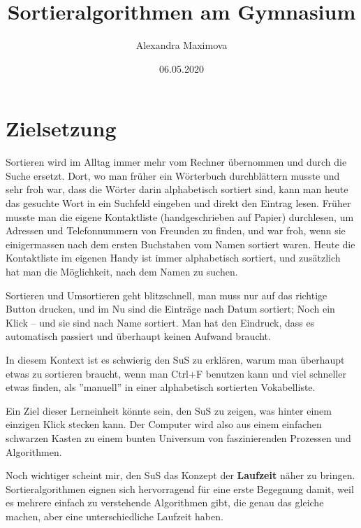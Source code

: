 \documentclass[
	12pt, %
	german, %
]{fphw}
\title{Sortieralgorithmen am Gymnasium} %
\author{Alexandra Maximova} %
\date{06.05.2020} %
\institute{ETH Zurich \\ Lehrdiplom Informatik} %
\begin{document}
\maketitle %


\section*{Zielsetzung}
Sortieren wird im Alltag immer mehr vom Rechner übernommen und durch die Suche ersetzt. Dort, wo man früher ein Wörterbuch durchblättern musste und sehr froh war, dass die Wörter darin alphabetisch sortiert sind, kann man heute das gesuchte Wort in ein Suchfeld eingeben und direkt den Eintrag lesen. Früher musste man die eigene Kontaktliste (handgeschrieben auf Papier) durchlesen, um Adressen und Telefonnummern von Freunden zu finden, und war froh, wenn sie einigermassen nach dem ersten Buchstaben vom Namen sortiert waren. Heute die Kontaktliste im eigenen Handy ist immer alphabetisch sortiert, und zusätzlich hat man die Möglichkeit, nach dem Namen zu suchen.

Sortieren und Umsortieren geht blitzschnell, man muss nur auf das richtige Button drucken, und im Nu sind die Einträge nach Datum sortiert; Noch ein Klick -- und sie sind nach Name sortiert. Man hat den Eindruck, dass es automatisch passiert und überhaupt keinen Aufwand braucht.

In diesem Kontext ist es schwierig den SuS zu erklären, warum man überhaupt etwas zu sortieren braucht, wenn man Ctrl+F benutzen kann und viel schneller etwas finden, als ''manuell'' in einer alphabetisch sortierten Vokabelliste.

Ein Ziel dieser Lerneinheit könnte sein, den SuS zu zeigen, was hinter einem einzigen Klick stecken kann. Der Computer wird also aus einem einfachen schwarzen Kasten zu einem bunten Universum von faszinierenden Prozessen und Algorithmen.

Noch wichtiger scheint mir, den SuS das Konzept der \textbf{Laufzeit} näher zu bringen. Sortieralgorithmen eignen sich hervorragend für eine erste Begegnung damit, weil es mehrere einfach zu verstehende Algorithmen gibt, die genau das gleiche machen, aber eine unterschiedliche Laufzeit haben.
\end{document}
